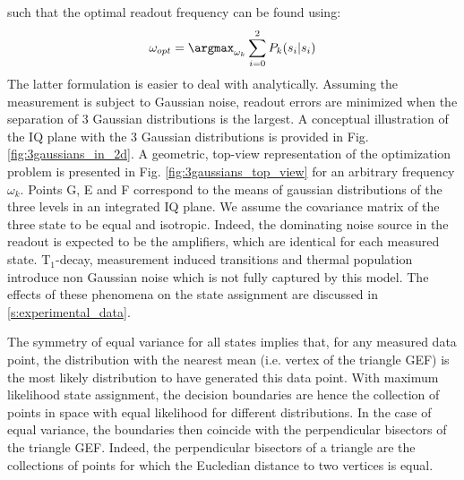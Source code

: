 such that the optimal readout frequency can be found using:
\begin{equation} \label{eq:opt_freq_proba}
\omega_{opt} = \argmax_{\omega_k}  \sum_{i=0}^2{P_k(s_i|s_i)}
\end{equation}
The latter formulation is easier to deal with analytically. Assuming the measurement is subject to Gaussian noise, readout errors are minimized when the separation of 3 Gaussian distributions is the largest. A conceptual illustration of the IQ plane with the 3 Gaussian distributions is provided in Fig. \ref{fig:3gaussians_in_2d}.
A geometric, top-view representation of the optimization problem is presented in Fig. \ref{fig:3gaussians_top_view} for an arbitrary frequency $\omega_k$. Points G, E and F correspond to the means of gaussian distributions of the three levels in an integrated IQ plane. We assume the covariance matrix of the three state to be equal and isotropic. Indeed, the dominating noise source in the readout is expected to be the amplifiers, which are identical for each measured state. T$_1$-decay, measurement induced transitions and thermal population introduce non Gaussian noise which is not fully captured by this model. The effects of these phenomena on the state assignment are discussed in \ref{s:experimental_data}. 

The symmetry of equal variance for all states implies that, for any measured data point, the distribution with the nearest mean (i.e. vertex of the triangle GEF) is the most likely distribution to have generated this data point. With maximum likelihood state assignment, the decision boundaries are hence the collection of points in space with equal likelihood for different distributions. In the case of equal variance,  the boundaries then coincide with the perpendicular bisectors of the triangle GEF. Indeed, the perpendicular bisectors of a triangle are the collections of points for which the Eucledian distance to two vertices is equal.

